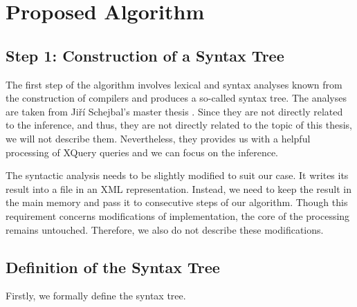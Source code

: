 \chapter{Proposed Algorithm}

\section{Step 1: Construction of a Syntax Tree}
The first step of the algorithm involves lexical and syntax analyses known from the construction of compilers and produces a so-called syntax tree. The analyses are taken from Ji\v r\'{i} Schejbal's master thesis . Since they are not directly related to the inference, and thus, they are not directly related to the topic of this thesis, we will not describe them. Nevertheless, they provides us with a helpful processing of XQuery queries and we can focus on the inference.

The syntactic analysis needs to be slightly modified to suit our case. It writes its result into a file in an XML representation. Instead, we need to keep the result in the main memory and pass it to consecutive steps of our algorithm. Though this requirement concerns modifications of implementation, the core of the processing remains untouched. Therefore, we also do not describe these modifications.

\section{Definition of the Syntax Tree}
Firstly, we formally define the syntax tree.

